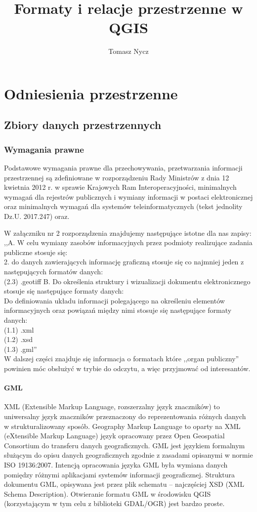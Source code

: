 \documentclass[a4paper,11pt, onecolumn, openany]{memoir}
\author{Tomasz Nycz}
\title{Formaty i relacje przestrzenne w QGIS}
\begin{document}
	\frontmatter

	\maketitle


\mainmatter
\part{Odniesienia przestrzenne}
	\chapter{Zbiory danych przestrzennych}
		\section{Wymagania prawne}
		Podstawowe wymagania prawne dla przechowywania, przetwarzania informacji przestrzennej są zdefiniowane w rozporządzeniu
Rady Ministrów z dnia 12 kwietnia 2012 r. w sprawie Krajowych Ram Interoperacyjności, minimalnych wymagań dla rejestrów publicznych i wymiany informacji w postaci elektronicznej oraz minimalnych wymagań dla systemów teleinformatycznych (tekst jednolity Dz.U. 2017.247) oraz.


		W załączniku nr 2 rozporządzenia znajdujemy następujące istotne dla nas zapisy:  
		,,A. W celu wymiany zasobów informacyjnych przez podmioty realizujące zadania publiczne stosuje się:\\
		2. do danych zawierających informację graficzną stosuje się co najmniej jeden z następujących formatów danych:\\
		(2.3) .geotiff
		B. Do określenia struktury i wizualizacji dokumentu elektronicznego stosuje się następujące formaty danych:\\
		Do definiowania układu informacji polegającego na określeniu elementów informacyjnych oraz powiązań między nimi stosuje się następujące formaty danych:\\
		(1.1) .xml\\
		(1.2) .xsd\\
		(1.3) .gml''\\
	W dalszej części znajduje się informacja o formatach które ,,organ publiczny'' powinien móc obsłużyć w trybie do odczytu, a więc przyjmować od interesantów. 	
			\subsection{GML}
			XML (Extensible Markup Language, rozszerzalny język znaczników) to uniwersalny język znaczników przeznaczony do reprezentowania różnych danych w strukturalizowany sposób. Geography Markup Language to oparty na XML (eXtensible Markup Language) język opracowany przez Open Geospatial Consortium do transferu danych geograficznych. GML jest językiem formalnym służącym do opisu danych geograficznych zgodnie z zasadami opisanymi w normie ISO 19136:2007. Intencją opracowania języka GML była wymiana danych pomiędzy różnymi aplikacjami systemów informacji geograficznej. Struktura dokumentu GML, opisywana jest przez plik schematu – najczęściej XSD (XML Schema Description). Otwieranie formatu GML w środowisku QGIS (korzystającym w tym celu z biblioteki GDAL/OGR) jest bardzo proste.
\end{document}
